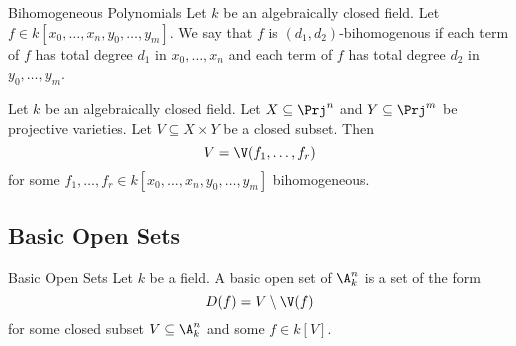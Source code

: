 \documentclass[a4paper]{article}
\begin{document}
\begin{defn}{Bihomogeneous Polynomials}{} Let $k$ be an algebraically closed field. Let $f\in k[x_0,\dots,x_n,y_0,\dots,y_m]$. We say that $f$ is $(d_1,d_2)$-bihomogenous if each term of $f$ has total degree $d_1$ in $x_0,\dots,x_n$ and each term of $f$ has total degree $d_2$ in $y_0,\dots,y_m$. 
\end{defn}

\begin{prp}{}{} Let $k$ be an algebraically closed field. Let $X\subseteq\Prj^n$ and $Y\subseteq\Prj^m$ be projective varieties. Let $V\subseteq X\times Y$ be a closed subset. Then $$V=\V(f_1,\dots,f_r)$$ for some $f_1,\dots,f_r\in k[x_0,\dots,x_n,y_0,\dots,y_m]$ bihomogeneous. 
\end{prp}

\subsection{Basic Open Sets}
\begin{defn}{Basic Open Sets}{} Let $k$ be a field. A basic open set of $\A_k^n$ is a set of the form $$D(f)=V\setminus\V(f)$$ for some closed subset $V\subseteq\A_k^n$ and some $f\in k[V]$. 
\end{defn}
\end{document}
